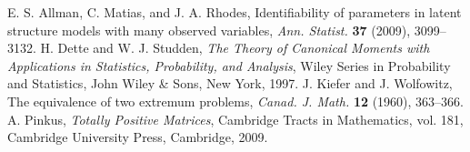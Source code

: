  E. S. Allman, C. Matias, and J. A. Rhodes,
Identifiability of parameters in latent structure models with many observed variables,
\emph{Ann. Statist.} \textbf{37} (2009), 3099--3132.
 H. Dette and W. J. Studden,
\emph{The Theory of Canonical Moments with Applications in Statistics, Probability, and Analysis},
Wiley Series in Probability and Statistics, John Wiley \& Sons, New York, 1997.
 J. Kiefer and J. Wolfowitz,
The equivalence of two extremum problems,
\emph{Canad. J. Math.} \textbf{12} (1960), 363--366.
 A. Pinkus,
\emph{Totally Positive Matrices}, Cambridge Tracts in Mathematics, vol. 181,
Cambridge University Press, Cambridge, 2009.
